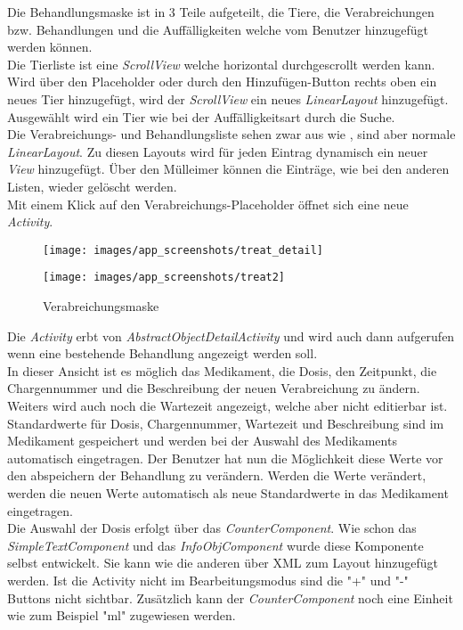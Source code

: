 Die Behandlungsmaske ist in 3 Teile aufgeteilt, die Tiere, die Verabreichungen bzw. Behandlungen und die Auffälligkeiten welche vom Benutzer hinzugefügt werden können. \\
Die Tierliste ist eine \textit{ScrollView} welche horizontal durchgescrollt werden kann. Wird über den Placeholder oder durch den Hinzufügen-Button rechts oben ein neues Tier hinzugefügt, wird der \textit{ScrollView} ein neues \textit{LinearLayout} hinzugefügt. Ausgewählt wird ein Tier wie bei der Auffälligkeitsart durch die Suche. \\
Die Verabreichungs- und Behandlungsliste sehen zwar aus wie , sind aber normale \textit{LinearLayout}. Zu diesen Layouts wird für jeden Eintrag dynamisch ein neuer \textit{View} hinzugefügt. Über den Mülleimer können die Einträge, wie bei den anderen Listen, wieder gelöscht werden. \\[0.5em]
Mit einem Klick auf den Verabreichungs-Placeholder öffnet sich eine neue \textit{Activity}.
\begin{figure}[H]
  \centering
  \begin{minipage}[t]{7 cm}
  	\centering
  	\texttt{[image: images/app\_screenshots/treat\_detail]} 
  \end{minipage}
  \hspace{0.5cm}
  \begin{minipage}[t]{7 cm}
	\centering
	\texttt{[image: images/app\_screenshots/treat2]}  
  \end{minipage}
  \caption{Verabreichungsmaske}
\end{figure}
Die \textit{Activity} erbt von \textit{AbstractObjectDetailActivity} und wird auch dann aufgerufen wenn eine bestehende Behandlung angezeigt werden soll. \\
In dieser Ansicht ist es möglich das Medikament, die Dosis, den Zeitpunkt, die Chargennummer und die Beschreibung der neuen Verabreichung zu ändern. Weiters wird auch noch die Wartezeit angezeigt, welche aber nicht editierbar ist. Standardwerte für Dosis, Chargennummer, Wartezeit und Beschreibung sind im Medikament gespeichert und werden bei der Auswahl des Medikaments automatisch eingetragen. Der Benutzer hat nun die Möglichkeit diese Werte vor den abspeichern der Behandlung zu verändern. Werden die Werte verändert, werden die neuen Werte automatisch als neue Standardwerte in das Medikament eingetragen. \\
Die Auswahl der Dosis erfolgt über das \textit{CounterComponent}. Wie schon das \textit{SimpleTextComponent} und das \textit{InfoObjComponent} wurde diese Komponente selbst entwickelt. Sie kann wie die anderen über XML zum Layout hinzugefügt werden. Ist die Activity nicht im Bearbeitungsmodus sind die "+" und "-" Buttons nicht sichtbar. Zusätzlich kann der \textit{CounterComponent} noch eine Einheit wie zum Beispiel "ml" zugewiesen werden. \\
